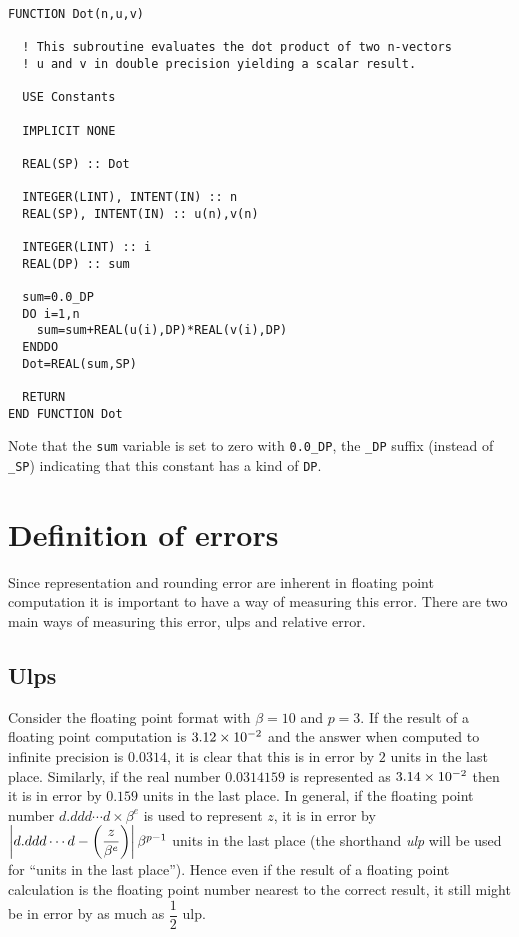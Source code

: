 \footnotesize
\begin{verbatim}
FUNCTION Dot(n,u,v)

  ! This subroutine evaluates the dot product of two n-vectors
  ! u and v in double precision yielding a scalar result.

  USE Constants

  IMPLICIT NONE

  REAL(SP) :: Dot

  INTEGER(LINT), INTENT(IN) :: n
  REAL(SP), INTENT(IN) :: u(n),v(n)

  INTEGER(LINT) :: i
  REAL(DP) :: sum

  sum=0.0_DP
  DO i=1,n
    sum=sum+REAL(u(i),DP)*REAL(v(i),DP)
  ENDDO
  Dot=REAL(sum,SP)

  RETURN
END FUNCTION Dot
\end{verbatim}
\normalsize

Note that the \texttt{sum} variable is set to zero with \texttt{0.0\_DP}, the
\texttt{\_DP} suffix (instead of \texttt{\_SP}) indicating that this constant
has a kind of \texttt{DP}.

\section{Definition of errors}

Since representation and rounding error are inherent in floating point
computation it is important to have a way of measuring this error. There are
two main ways of measuring this error, ulps and relative error.

\subsection{Ulps}

Consider the floating point format with $\beta=10$ and $p=3$. If the result of
a floating point computation is $3.12 \times  10^{-2}  $ and the answer when computed
to infinite precision is $0.0314$, it is clear that this is in error by $2$
units in the last place. Similarly, if the real number $0.0314159$ is
represented as $3.14 \times  10^{-2}  $ then it is in error by $0.159$ units in the
last place. In general, if the floating point number $d.ddd \cdots d \times
\beta^{e}$ is used to represent $z$, it is in error by $\left| d.ddd \cdots d -
  \left( \dfrac{z}{\beta^{e}} \right) \right|\beta^{p-1}$ units in the last place (the
shorthand \emph{ulp} will be used for ``units in the last place''). Hence
even if the result of a floating point calculation is the floating point
number nearest to the correct result, it still might be in error by as much as
$\dfrac{1}{2}$ ulp.

